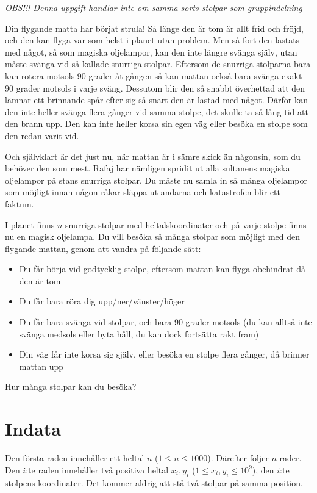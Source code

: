 \textit{OBS!!! Denna uppgift handlar inte om samma sorts stolpar som gruppindelning}

Din flygande matta har börjat strula! Så länge den är tom är allt frid och fröjd, och den kan
flyga var som helst i planet utan problem. Men så fort den lastats med något, så som magiska oljelampor,
kan den inte längre svänga själv, utan måste svänga vid så kallade snurriga stolpar. Eftersom
de snurriga stolparna bara kan rotera motsols 90 grader åt gången så kan mattan också bara svänga exakt
90 grader motsols i varje sväng. Dessutom blir den så snabbt överhettad att den lämnar ett brinnande
spår efter sig så snart den är lastad med något. Därför kan den inte heller svänga flera gånger vid
samma stolpe, det skulle ta så lång tid att den brann upp. Den kan inte heller korsa sin egen väg eller
besöka en stolpe som den redan varit vid.

Och självklart är det just nu, när mattan är i sämre skick än någonsin, som du behöver den som mest.
Rafaj har nämligen spridit ut alla sultanens magiska oljelampor på stans snurriga stolpar.
Du måste nu samla in så många oljelampor som möjligt innan någon råkar släppa ut andarna och
katastrofen blir ett faktum.

I planet finns $n$ snurriga stolpar med heltalskoordinater och på varje stolpe finns nu en magisk oljelampa.
Du vill besöka så många stolpar som möjligt med den flygande mattan, genom att vandra på följande sätt:
\begin{itemize}
  \item Du får börja vid godtycklig stolpe, eftersom mattan kan flyga obehindrat då den är tom
  \item Du får bara röra dig upp/ner/vänster/höger
  \item Du får bara svänga vid stolpar, och bara 90 grader motsols (du kan alltså inte svänga medsols eller byta håll, du kan dock fortsätta rakt fram)
  \item Din väg får inte korsa sig själv, eller besöka en stolpe flera gånger, då brinner mattan upp
\end{itemize}
Hur många stolpar kan du besöka?

\section*{Indata}
Den första raden innehåller ett heltal $n$ ($1 \leq n \leq 1000$).
Därefter följer $n$ rader. Den $i$:te raden innehåller två positiva heltal
$x_{i}, y_{i}$ ($1 \leq x_{i}, y_{i} \leq 10^9$), den $i$:te stolpens koordinater.
Det kommer aldrig att stå två stolpar på samma position.

